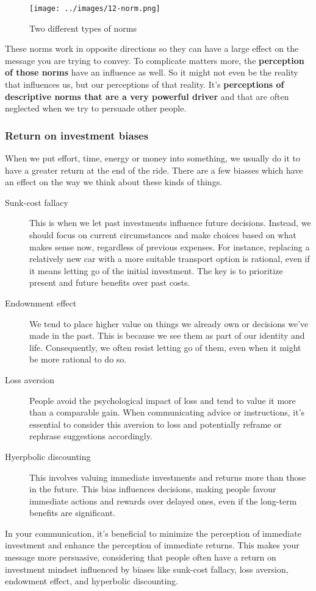 \documentclass[../summary.tex]{subfiles}
\begin{document}
				\begin{figure}[h]
					\centering
					\texttt{[image: ../images/12-norm.png]}
					\caption{Two different types of norms}
					\label{fig:12-norm}
				\end{figure}
				These norms work in opposite directions so they can have a large effect on the message you are trying to convey. To complicate matters more, the \textbf{perception of those norms} have an influence as well. So it might not even be the reality that influences us, but our perceptions of that reality. It's \textbf{perceptions of descriptive norms that are a very powerful driver} and that are often neglected when we try to persuade other people.
				
			\subsubsection{Return on investment biases}
				When we put effort, time, energy or money into something, we usually do it to have a greater return at the end of the ride. There are a few biasses which have an effect on the way we think about these kinds of things. 
				\begin{description}
					\item[Sunk-cost fallacy] This is when we let past investments influence future decisions. Instead, we should focus on current circumstances and make choices based on what makes sense now, regardless of previous expenses. For instance, replacing a relatively new car with a more suitable transport option is rational, even if it means letting go of the initial investment. The key is to prioritize present and future benefits over past costs.
					\item[Endownment effect] We tend to place higher value on things we already own or decisions we've made in the past. This is because we see them as part of our identity and life. Consequently, we often resist letting go of them, even when it might be more rational to do so.
					\item[Loss aversion] People avoid the psychological impact of loss and tend to value it more than a comparable gain. When communicating advice or instructions, it's essential to consider this aversion to loss and potentially reframe or rephrase suggestions accordingly.
					\item[Hyerpbolic discounting] This involves valuing immediate investments and returns more than those in the future. This bias influences decisions, making people favour immediate actions and rewards over delayed ones, even if the long-term benefits are significant.
				\end{description}
				In your communication, it's beneficial to minimize the perception of immediate investment and enhance the perception of immediate returns. This makes your message more persuasive, considering that people often have a return on investment mindset influenced by biases like sunk-cost fallacy, loss aversion, endowment effect, and hyperbolic discounting.
			
\end{document}
